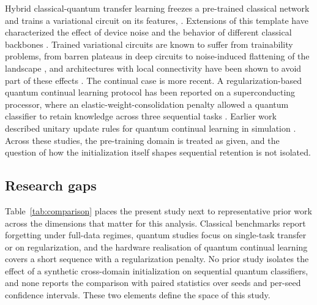 \documentclass[preprint,number,sort&compress]{elsarticle}
\begin{document}
Hybrid classical-quantum transfer learning freezes a pre-trained classical
network and trains a variational circuit on its features,
\cite{mari2020transfer}. Extensions of this template have characterized the
effect of device noise \cite{martinperez2026cmes} and the behavior of
different classical backbones \cite{martinperez2026soco}. Trained
variational circuits are known to suffer from trainability problems, from
barren plateaus in deep circuits \cite{mcclean2018barren, cerezo2021cost,
Sharma22} to noise-induced flattening of the landscape
\cite{Wang21}, and architectures with local connectivity have been
shown to avoid part of these effects \cite{pesah2021absence}. The continual
case is more recent. A regularization-based quantum continual learning
protocol has been reported on a superconducting processor, where an
elastic-weight-consolidation penalty allowed a quantum classifier to retain
knowledge across three sequential tasks \cite{Zhang26}. Earlier work
described unitary update rules for quantum continual learning in simulation
\cite{senicourt2021quantum}. Across these studies, the pre-training domain
is treated as given, and the question of how the initialization itself
shapes sequential retention is not isolated.

\subsection{Research gaps}

Table~\ref{tab:comparison} places the present study next to representative
prior work across the dimensions that matter for this analysis. Classical
benchmarks report forgetting under full-data regimes, quantum studies focus
on single-task transfer or on regularization, and the hardware realisation
of quantum continual learning covers a short sequence with a regularization
penalty. No prior study isolates the effect of a synthetic cross-domain
initialization on sequential quantum classifiers, and none reports the
comparison with paired statistics over seeds and per-seed confidence
intervals. These two elements define the space of this study.
\end{document}
